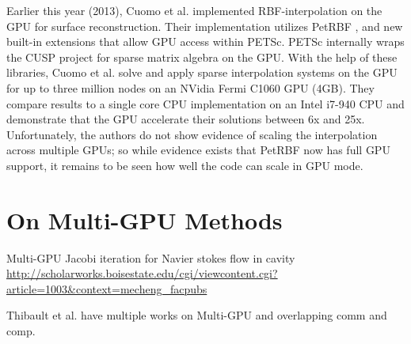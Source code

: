 \documentclass[11pt]{report}
\begin{document}
Earlier this year (2013), Cuomo et al. \cite{Cuomo2013} implemented RBF-interpolation on the GPU for surface reconstruction. Their implementation utilizes PetRBF \cite{Yokota2010}, and new built-in extensions that allow GPU access within PETSc. PETSc internally wraps the CUSP project \cite{CUSP} for sparse matrix algebra on the GPU. With the help of these libraries, Cuomo et al. solve and apply sparse interpolation systems on the GPU for up to three million nodes on an NVidia Fermi C1060 GPU (4GB). They compare results to a single core CPU implementation on an Intel i7-940 CPU and demonstrate that the GPU accelerate their solutions between 6x and 25x. Unfortunately, the authors do not show evidence of scaling the interpolation across multiple GPUs; so while evidence exists that PetRBF now has full GPU support, it remains to be seen how well the code can scale in GPU mode. 
 
\section{On Multi-GPU Methods}
 
Multi-GPU Jacobi iteration for Navier stokes flow in cavity \url{http://scholarworks.boisestate.edu/cgi/viewcontent.cgi?article=1003&context=mecheng_facpubs}

Thibault et al. have multiple works on Multi-GPU and overlapping comm and comp. 



\ifstandalone


\end{document}
